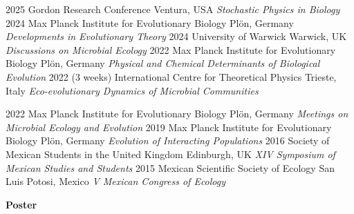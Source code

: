 \documentclass[]{friggeri-cv} %
\begin{document}
\begin{entrylist}
\entry
{2025}
{}
{Gordon Research Conference}
{Ventura, USA}
{{\normalsize\emph{Stochastic Physics in Biology}}}
{\vspace{-3mm}}
\entry
{2024}
{}%
{Max Planck Institute for Evolutionary Biology}
{Plön, Germany}
{{\normalsize\emph{Developments in Evolutionary Theory}}}
{\vspace{-3mm}}
\entry
{2024}
{}%
{University of Warwick}
{Warwick, UK}
{{\normalsize\emph{Discussions on Microbial Ecology}}}
{\vspace{-3mm}}
\entry
{2022}
{}%
{Max Planck Institute for Evolutionary Biology}
{Plön, Germany}
{{\normalsize\emph{Physical and Chemical Determinants of Biological Evolution}}}
{\vspace{-3mm}}
\entry
{2022}
{(3 weeks)}
{International Centre for Theoretical Physics}
{Trieste, Italy}
{{\normalsize\emph{Eco-evolutionary Dynamics of Microbial Communities}}}
{\vspace{-3mm}}
\end{entrylist}
\begin{entrylist}
\entry
{2022}
{}%
{Max Planck Institute for Evolutionary Biology}
{Plön, Germany}
{{\normalsize\emph{Meetings on Microbial Ecology and Evolution}}}
{\vspace{-3mm}}
\entry
{2019}
{}%
{Max Planck Institute for Evolutionary Biology}
{Plön, Germany}
{{\normalsize\emph{Evolution of Interacting Populations}}}
{\vspace{-3mm}}
\entry
{2016}
{}%
{Society of Mexican Students in the United Kingdom}
{Edinburgh, UK}
{{\normalsize\emph{XIV Symposium of Mexican Studies and Students}}}
{\vspace{-3mm}}
\entry
{2015}
{}%
{Mexican Scientific Society of Ecology}
{San Luis Potosi, Mexico}
{{\normalsize\emph{V Mexican Congress of Ecology}}}
{\vspace{-3mm}}
\end{entrylist}

\textbf{Poster}
\end{document}
